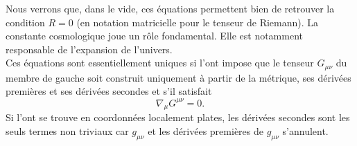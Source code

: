 \documentclass[a4paper,11pt]{report}
\begin{document}
            \begin{thm}\begin{leftbar}
                
            \end{leftbar}\end{thm}
            Nous verrons que, dans le vide, ces équations permettent bien de retrouver la condition $R = 0$ (en notation matricielle pour le tenseur de Riemann). La constante cosmologique joue un rôle fondamental. Elle est notamment responsable de l'expansion de l'univers.\\
            
            Ces équations sont essentiellement uniques si l'ont impose que le tenseur $G_{\mu\nu}$ du membre de gauche soit construit uniquement à partir de la métrique, ses dérivées premières et ses dérivées secondes et s'il satisfait
            \begin{equation}
                \nabla_\mu G^{\mu\nu} = 0.
            \end{equation}
            Si l'ont se trouve en coordonnées localement plates, les dérivées secondes sont les seuls termes non triviaux car $g_{\mu\nu}$ et les dérivées premières de $g_{\mu\nu}$ s'annulent.\\
            
\end{document}
